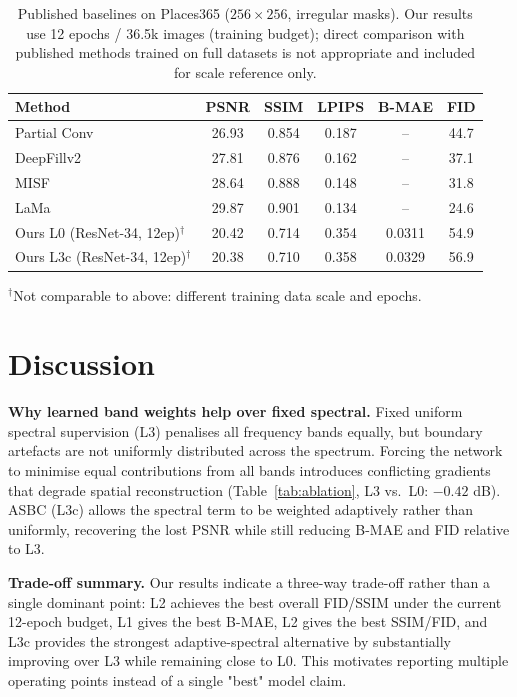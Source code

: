 \documentclass[10pt,conference]{IEEEtran}
\begin{document}
\begin{table}[t]
  \centering
  \caption{Published baselines on Places365 ($256{\times}256$, irregular masks).
    Our results use 12 epochs / 36.5k images (training budget); direct comparison
    with published methods trained on full datasets is not appropriate and included
    for scale reference only.}
  \label{tab:sota}
  \setlength{\tabcolsep}{4pt}
  \begin{tabular}{lccccc}
    \toprule
    \textbf{Method} & \textbf{PSNR} & \textbf{SSIM} & \textbf{LPIPS} & \textbf{B-MAE} & \textbf{FID} \\
    \midrule
    Partial Conv~\cite{liu2018partial}    & 26.93 & 0.854 & 0.187 & -- & 44.7 \\
    DeepFillv2~\cite{yu2019free}          & 27.81 & 0.876 & 0.162 & -- & 37.1 \\
    MISF~\cite{li2022misf}                & 28.64 & 0.888 & 0.148 & -- & 31.8 \\
    LaMa~\cite{suvorov2022resolution}     & 29.87 & 0.901 & 0.134 & -- & 24.6 \\
    \midrule
    Ours L0 (ResNet-34, 12ep)$^\dagger$   & 20.42 & 0.714 & 0.354 & 0.0311 & 54.9 \\
    Ours L3c (ResNet-34, 12ep)$^\dagger$  & 20.38 & 0.710 & 0.358 & 0.0329 & 56.9 \\
    \bottomrule
  \end{tabular}
  {\small $^\dagger$Not comparable to above: different training data scale and epochs.}
\end{table}

\section{Discussion}
\label{sec:discussion}

\textbf{Why learned band weights help over fixed spectral.}
Fixed uniform spectral supervision (L3) penalises all frequency bands equally,
but boundary artefacts are not uniformly distributed across the spectrum.
Forcing the network to minimise equal contributions from all bands introduces
conflicting gradients that degrade spatial reconstruction (Table~\ref{tab:ablation},
L3 vs.\ L0: $-0.42$ dB).  ASBC (L3c) allows the spectral term to be weighted
adaptively rather than uniformly, recovering the
lost PSNR while still reducing B-MAE and FID relative to L3.

\textbf{Trade-off summary.}
Our results indicate a three-way trade-off rather than a single dominant point:
L2 achieves the best overall FID/SSIM under the current 12-epoch budget,
L1 gives the best B-MAE, L2 gives the best SSIM/FID, and L3c provides the
strongest adaptive-spectral alternative by substantially improving over L3
while remaining close to L0.
This motivates reporting multiple operating points instead of a single "best"
model claim.
\end{document}
